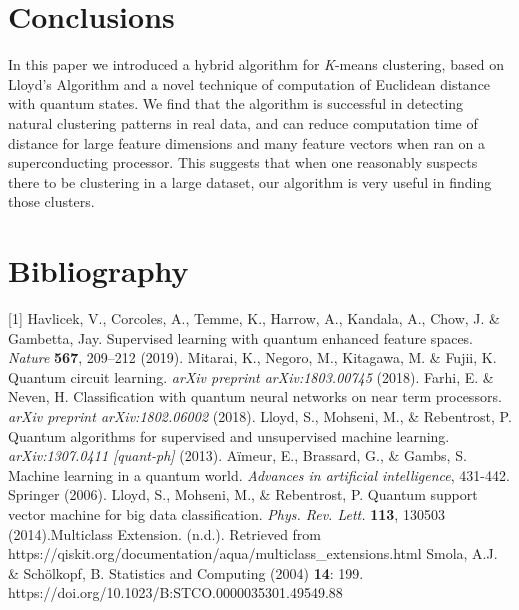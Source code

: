 \documentclass[twocolumn, english]{revtex4-2}
\begin{document}
\section{Conclusions}
In this paper we introduced a hybrid algorithm for \textit{K}-means clustering, based on Lloyd's Algorithm and a novel technique of computation of Euclidean distance with quantum states. We find that the algorithm is successful in detecting natural clustering patterns in real data, and can reduce computation time of distance for large feature dimensions and many feature vectors when ran on a superconducting processor. This suggests that when one reasonably suspects there to be clustering in a large dataset, our algorithm is very useful in finding those clusters.

\newpage
\section{Bibliography}
[1] Havlicek, V., Corcoles, A., Temme, K., Harrow, A., Kandala, A., Chow, J. \& Gambetta, Jay. Supervised learning with quantum enhanced feature spaces. \textit{Nature} \textbf{567}, 209–212 (2019). \newline
[2] Mitarai, K., Negoro, M., Kitagawa, M. \& Fujii, K. Quantum circuit learning. \textit{arXiv preprint arXiv:1803.00745} (2018). \newline
[3] Farhi, E. \& Neven, H. Classification with quantum neural networks on near term processors. \textit{arXiv preprint arXiv:1802.06002} (2018). \newline
[4] Lloyd, S., Mohseni, M., \& Rebentrost, P. Quantum algorithms for supervised and unsupervised machine learning. \textit{	arXiv:1307.0411 [quant-ph]} (2013). \newline
[5] Aïmeur, E., Brassard, G., \& Gambs, S. Machine learning in a quantum world. \textit{Advances in artificial intelligence}, 431-442. Springer (2006). \newline
[6] Lloyd, S., Mohseni, M., \& Rebentrost, P. Quantum support vector machine for big data classification. \textit{Phys. Rev. Lett.} \textbf{113}, 130503 (2014).\newline
[7] Multiclass Extension. (n.d.). \newline Retrieved from https://qiskit.org/documentation/aqua/\newline multiclass\_extensions.html \newline
[8] Smola, A.J. \& Schölkopf, B. Statistics and Computing (2004) \textbf{14}: 199. https://doi.org/10.1023\newline/B:STCO.0000035301.49549.88
\end{document}
